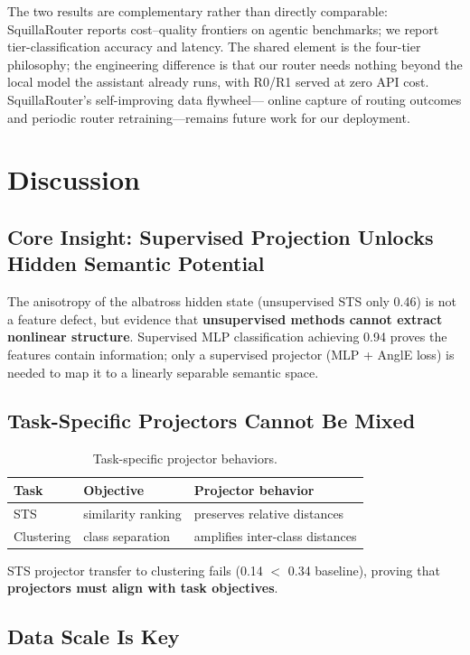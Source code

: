 \documentclass[11pt]{article}
\begin{document}
The two results are complementary rather than directly comparable:
SquillaRouter reports cost--quality frontiers on agentic benchmarks; we
report tier-classification accuracy and latency. The shared element is the
four-tier philosophy; the engineering difference is that our router needs
nothing beyond the local model the assistant already runs, with R0/R1
served at zero API cost. SquillaRouter's self-improving data flywheel---
online capture of routing outcomes and periodic router retraining---remains
future work for our deployment.

\section{Discussion}

\subsection{Core Insight: Supervised Projection Unlocks Hidden Semantic
Potential}
\label{sec:insight}

The anisotropy of the albatross hidden state (unsupervised STS only 0.46)
is not a feature defect, but evidence that \textbf{unsupervised methods
cannot extract nonlinear structure}. Supervised MLP classification achieving
0.94 proves the features contain information; only a supervised projector
(MLP + AnglE loss) is needed to map it to a linearly separable semantic
space.

\subsection{Task-Specific Projectors Cannot Be Mixed}

\begin{table}[h]
\centering
\begin{tabular}{lll}
\toprule
Task & Objective & Projector behavior \\
\midrule
STS & similarity ranking & preserves relative distances \\
Clustering & class separation & amplifies inter-class distances \\
\bottomrule
\end{tabular}
\caption{Task-specific projector behaviors.}
\end{table}

STS projector transfer to clustering fails (0.14 $<$ 0.34 baseline),
proving that \textbf{projectors must align with task objectives}.

\subsection{Data Scale Is Key}
\end{document}
